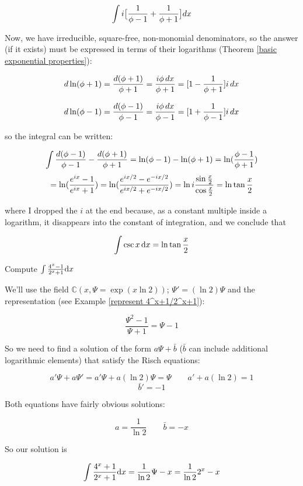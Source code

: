 $$\int i \big[ {{1}\over{\phi-1}} + {{1}\over{\phi+1}} \big] dx$$

Now, we have irreducible, square-free, non-monomial denominators, so
the answer (if it exists) must be expressed in terms of their
logarithms (Theorem \ref{basic exponential properties}):

$$ d \ln(\phi+1) = {{d(\phi+1)}\over{\phi+1}} = {{i\phi\,dx}\over{\phi+1}} = [1 - {{1}\over{\phi+1}}]i\,dx$$

$$ d \ln(\phi-1) = {{d(\phi-1)}\over{\phi-1}} = {{i\phi\,dx}\over{\phi-1}} = [1 + {{1}\over{\phi-1}}]i\,dx$$

so the integral can be written:

$$\int {{d(\phi-1)}\over{\phi-1}} - {{d(\phi+1)}\over{\phi+1}} = \ln (\phi-1) - \ln(\phi+1) = \ln({{\phi-1}\over{\phi+1}})$$
$$ = \ln ({{e^{ix}-1}\over{e^{ix}+1}}) = \ln ({{e^{ix/2}-e^{-ix/2}}\over{e^{ix/2}+e^{-ix/2}}}) = \ln i {{\sin {x\over2}}\over{\cos {x\over2}}} = \ln \tan {x\over2} $$

where I dropped the $i$ at the end because, as a constant multiple
inside a logarithm, it disappears into the constant of integration,
and we conclude that

$$\int \csc x \,{\rm d}x = \ln \tan {x\over2} $$

\endexample

\vfil\eject

\example Compute $\int {{4^x-1}\over{2^x+1}} {\rm d}x$
\label{integrate 4^x-1/2^x+1}

We'll use the field ${\mathbb C}(x,\Psi = \exp(x \ln 2))$; $\Psi' =
(\ln 2)\Psi$ and the representation (see Example
\ref{represent 4^x+1/2^x+1}):

$$ \frac{\Psi^2-1}{\Psi+1} = \Psi-1$$

So we need to find a solution of the form $a\Psi + \bar{b}$ ($\bar{b}$
can include additional logarithmic elements) that satisfy the Risch
equations:

$$a'\Psi + a\Psi' = a'\Psi + a(\ln 2)\Psi = \Psi \qquad a' + a(\ln 2) = 1$$
$$\bar{b}' = -1$$

Both equations have fairly obvious solutions:

$$a = \frac{1}{\ln 2} \qquad \bar{b}=-x$$

So our solution is

$$\int {{4^x+1}\over{2^x+1}} {\rm d}x = \frac{1}{\ln 2}\Psi - x =
\frac{1}{\ln 2}2^x - x$$

\endexample


\vfil\eject

